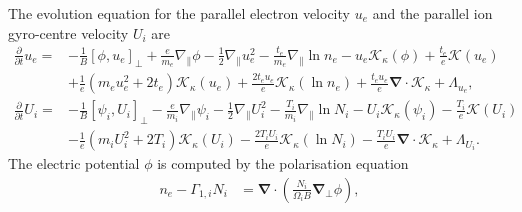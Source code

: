 \documentclass{hitec} %
\renewcommand{\vec}[1]{\boldsymbol{#1}}
\begin{document}
The evolution equation for the parallel electron velocity \(u_e\) and the parallel ion gyro-centre velocity \(U_i\) are 
\begin{align}
\frac{\partial}{\partial t}  u_e 
      =&
      - \frac{1 }{ B} \left[ \phi, u_e  \right]_{\perp} 
      +  \frac{e}{m_e}   \nabla_\parallel \phi  
      -   \frac{1}{2}   \nabla_\parallel u_e^2
      - \frac{t_e}{m_e } \nabla_\parallel \ln  n_e     
     - u_e   \mathcal{K}_{\kappa} \left( \phi  \right)   
     + \frac{t_e}{e} \mathcal{K}\left(  u_e \right)     
     \nonumber  \\    &
     + \frac{1}{e} \left(m_e  u_e^2 +  2  t_e\right)\mathcal{K}_{\kappa} \left(u_e\right)      
    + \frac{2  t_e u_e }{ e} \mathcal{K}_{\kappa} \left(\ln n_e \right)  
    + \frac{t_e  u_e }{e} \vec{\nabla} \cdot  \vec{\mathcal{K}}_{\kappa} 
      +\Lambda_{u_e},  \\
\frac{\partial}{\partial t}    U_i 
      =&
      - \frac{1 }{ B} \left[ \psi_i, U_i  \right]_{\perp} 
      -  \frac{e}{m_i}   \nabla_\parallel \psi_i  
      -     \frac{1}{2}  \nabla_\parallel U_i^2
      - \frac{T_i}{m_i } \nabla_\parallel \ln  N_i     
     -  U_i  \mathcal{K}_{\kappa} \left( \psi_i  \right)   
     - \frac{T_i}{e} \mathcal{K}\left(  U_i \right)     
     \nonumber  \\    &
           - \frac{1}{e}\left(m_i  U_i^2 + 2  T_i \right) \mathcal{K}_{\kappa} \left(U_i\right)      
           - \frac{2  T_i U_i }{ e} \mathcal{K}_{\kappa} \left(\ln N_i \right)   
           - \frac{T_i  U_i }{e} \vec{\nabla} \cdot  \vec{\mathcal{K}}_{\kappa} 
+\Lambda_{U_i}  .
\end{align}
The electric potential \(\phi\) is computed by the polarisation equation
\begin{align}
  n_e -\Gamma_{1,i} N_i &= \vec{\nabla} \cdot\left(\frac{N_i}{\Omega_i B} \vec{\nabla}_\perp \phi\right),
\end{align}
\end{document}
